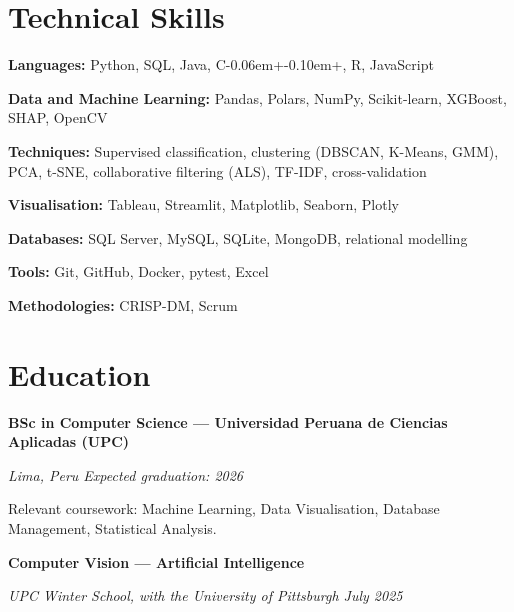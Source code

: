 \documentclass[10pt,letterpaper]{article}
\newcommand{\entry}[2]{%
    \vspace{0.55ex}
    \textbf{#1}\par
    {\small\itshape\color{muted}#2}\par
    \vspace{0.15ex}
}
\newcommand{\skillrow}[2]{%
    \textbf{#1:} #2\par
    \vspace{0.25ex}
}
\newcommand{\cpp}{C\kern-0.06em{+}\kern-0.10em{+}}
\begin{document}

\section{Technical Skills}

\skillrow{Languages}
{Python, SQL, Java, \cpp, R, JavaScript}

\skillrow{Data and Machine Learning}
{Pandas, Polars, NumPy, Scikit-learn, XGBoost, SHAP, OpenCV}

\skillrow{Techniques}
{Supervised classification, clustering (DBSCAN, K-Means, GMM), PCA, t-SNE,
collaborative filtering (ALS), TF-IDF, cross-validation}

\skillrow{Visualisation}
{Tableau, Streamlit, Matplotlib, Seaborn, Plotly}

\skillrow{Databases}
{SQL Server, MySQL, SQLite, MongoDB, relational modelling}

\skillrow{Tools}
{Git, GitHub, Docker, pytest, Excel}

\skillrow{Methodologies}
{CRISP-DM, Scrum}


\section{Education}

\entry
{BSc in Computer Science --- Universidad Peruana de Ciencias Aplicadas (UPC)}
{Lima, Peru \textbar{} Expected graduation: 2026}

Relevant coursework: Machine Learning, Data Visualisation, Database Management,
Statistical Analysis.


\entry
{Computer Vision --- Artificial Intelligence}
{UPC Winter School, with the University of Pittsburgh \textbar{} July 2025}
\end{document}
